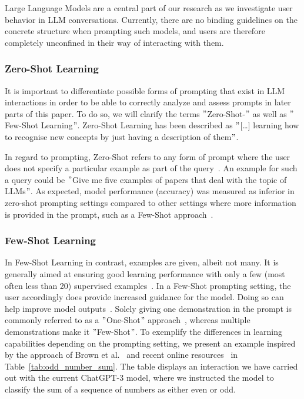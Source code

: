 Large Language Models are a central part of our research as we investigate user behavior in LLM
conversations.
Currently, there are no binding guidelines on the concrete structure when prompting such models,
and users are therefore completely unconfined in their way of interacting with them.



\subsubsection{Zero-Shot Learning} %
It is important to differentiate possible forms of prompting that exist in LLM interactions in order
to be able to correctly analyze and assess prompts in later parts of this paper.
To do so, we will clarify the terms \("\)Zero-Shot-\("\) as well as \("\)Few-Shot Learning\("\).
Zero-Shot Learning has been described as \("\)[\ldots] learning how to recognise
new concepts by just having a description of them\("\)\cite[p. 1]{feris_embarrassingly_2015}.

In regard to prompting, Zero-Shot refers to any form of prompt where the user does not specify
a particular example as part of the query~\cite[p. 1]{dang_how_2022}.
An example for such a query could be \("\)Give me five examples of papers that deal with the topic
of LLMs\("\).
As expected, model performance (accuracy) was measured as inferior in zero-shot prompting settings compared
to other settings where more information is provided in the prompt, such as a Few-Shot approach~\cite[p. 5]{brown_language_2020}.


\subsubsection{Few-Shot Learning}
In Few-Shot Learning in contrast, examples are given, albeit not many.
It is generally aimed at ensuring good learning performance with only a few (most often less than 20)
supervised examples~\cite[p. 1]{samuel_offline_2022}. %
In a Few-Shot prompting setting, the user accordingly does provide increased guidance for the model.
Doing so can help improve model outputs~\cite[p. 1]{dang_how_2022}.
Solely giving one demonstration in the prompt is commonly referred to as a \("\)One-Shot\("\) approach~\cite[p. 6]{brown_language_2020},
whereas multiple demonstrations make it \("\)Few-Shot\("\).
To exemplify the differences in learning capabilities depending on the prompting setting,
we present an example inspired by the approach of Brown et al\(.\)~\cite{brown_language_2020}
and recent online resources~\cite{dairai_few-shot_2023} in Table~\ref{tab:odd_number_sum}.
The table displays an interaction we have carried out with the current ChatGPT-3 model, where we
instructed the model to classify the sum of a sequence of numbers as either even or odd.

